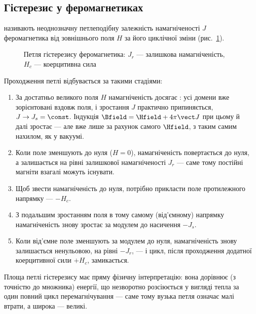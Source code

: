 \subsection*{Гістерезис у феромагнетиках}

 називають неоднозначну петлеподібну залежність намагніченості $J$ феромагнетика від зовнішнього поля $H$ за його циклічної
зміни (рис.~\ref{pic:Hysteresis}).

\begin{figure}\centering
	\caption{Петля гістерезису феромагнетика: $J_r$ --- залишкова намагніченість, $H_c$ ---
		коерцитивна сила\label{pic:Hysteresis}}
\end{figure}

Проходження петлі відбувається за такими стадіями:
\begin{enumerate}
	\item За достатньо великого поля $H$ намагніченість досягає : усі домени вже зорієнтовані вздовж поля, і зростання $J$
	      практично припиняється, $J\to J_s=\const$. Індукція $\Bfield = \Hfield+4\pi\vect J$ при цьому й далі зростає --- але вже лише за
	      рахунок самого $\Hfield$, з таким самим нахилом, як у вакуумі.
	\item Коли поле зменшують до нуля ($H=0$), намагніченість  повертається до нуля, а залишається на рівні залишкової намагніченості
	      $J_r$ --- саме тому постійні магніти взагалі можуть існувати.
	\item Щоб звести намагніченість до нуля, потрібно прикласти поле протилежного напрямку ---  $-H_c$.
	\item З подальшим зростанням поля в тому самому (від'ємному) напрямку намагніченість знову зростає за модулем до насичення $-J_s$.
	\item Коли від'ємне поле зменшують за модулем до нуля, намагніченість знову залишається ненульовою, на рівні $-J_r$, --- і цикл, після проходження
	      додатної коерцитивної сили $+H_c$, замикається.
\end{enumerate}

\begin{Attention}
	Площа петлі гістерезису має пряму фізичну інтерпретацію: вона дорівнює (з точністю до множника) енергії, що незворотно розсіюється у вигляді
	тепла за один повний цикл перемагнічування --- саме тому вузька петля означає малі втрати, а широка --- великі.
\end{Attention}

